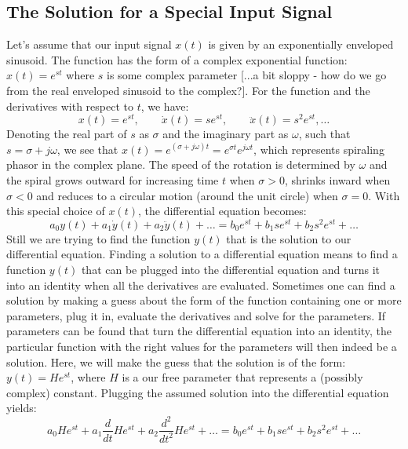 \subsection{The Solution for a Special Input Signal}                       
Let's assume that our input signal $x(t)$ is given by an exponentially enveloped sinusoid. The function has the form of a complex exponential function: $x(t) = e^{st}$ where $s$ is some complex parameter [...a bit sloppy - how do we go from the real enveloped sinusoid to the complex?]. For the function and the derivatives with respect to $t$, we have:
\begin{equation}
 x(t) = e^{st}, \qquad \dot{x}(t) = s e^{st}, \qquad \ddot{x}(t) = s^2 e^{st}, \ldots 
\end{equation} 
Denoting the real part of $s$ as $\sigma$ and the imaginary part as $\omega$, such that $s = \sigma + j \omega$, we see that $x(t) = e^{(\sigma + j \omega) t} =  e^{\sigma t} e^{j \omega t}$, which represents spiraling phasor in the complex plane. The speed of the rotation is determined by $\omega$ and the spiral grows outward for increasing time $t$ when $\sigma > 0$, shrinks inward when $\sigma < 0$ and reduces to a circular motion (around the unit circle) when $\sigma = 0$.
With this special choice of $x(t)$, the differential equation becomes:
\begin{equation}
 a_0 y(t) + a_1 \dot{y}(t) + a_2 \ddot{y}(t) + \ldots = b_0 e^{st} + b_1 s e^{st} + b_2 s^2 e^{st} + \ldots 
\end{equation}  
Still we are trying to find the function $y(t)$ that is the solution to our differential equation. Finding a solution to a differential equation means to find a function $y(t)$ that can be plugged into the differential equation and turns it into an identity when all the derivatives are evaluated. Sometimes one can find a solution by making a guess about the form of the function containing one or more parameters, plug it in, evaluate the derivatives and solve for the parameters. If parameters can be found that turn the differential equation into an identity, the particular function with the right values for the parameters will then indeed be a solution. Here, we will make the guess that the solution is of the form: $y(t) = H e^{st}$, where $H$ is a our free parameter that represents a (possibly complex) constant. Plugging the assumed solution into the differential equation yields:
\begin{equation}
 a_0 H e^{st} + a_1 \frac{d}{dt} H e^{st} + a_2 \frac{d^2}{dt^2} H e^{st} + \ldots = b_0 e^{st} + b_1 s e^{st} + b_2 s^2 e^{st} + \ldots 
\end{equation}  
